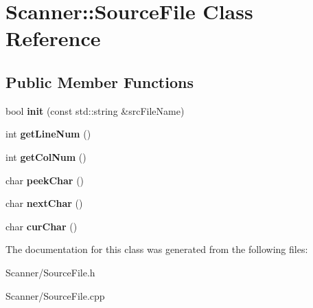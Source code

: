 \hypertarget{class_scanner_1_1_source_file}{}\section{Scanner\+:\+:Source\+File Class Reference}
\label{class_scanner_1_1_source_file}
\subsection*{Public Member Functions}
\begin{DoxyCompactItemize}
\item 
bool {\bfseries init} (const std\+::string \&src\+File\+Name)\hypertarget{class_scanner_1_1_source_file_a9eebbc5f778162566288961966df398c}{}\label{class_scanner_1_1_source_file_a9eebbc5f778162566288961966df398c}

\item 
int {\bfseries get\+Line\+Num} ()\hypertarget{class_scanner_1_1_source_file_a919d7efa693790e75e7051fc67479e34}{}\label{class_scanner_1_1_source_file_a919d7efa693790e75e7051fc67479e34}

\item 
int {\bfseries get\+Col\+Num} ()\hypertarget{class_scanner_1_1_source_file_a3e0efd4171c7225474bf1d9c5f5a8299}{}\label{class_scanner_1_1_source_file_a3e0efd4171c7225474bf1d9c5f5a8299}

\item 
char {\bfseries peek\+Char} ()\hypertarget{class_scanner_1_1_source_file_ac6f02448138ec25c4e8e338d645ea256}{}\label{class_scanner_1_1_source_file_ac6f02448138ec25c4e8e338d645ea256}

\item 
char {\bfseries next\+Char} ()\hypertarget{class_scanner_1_1_source_file_a7592182b0200b3f095ad6642ce2f6092}{}\label{class_scanner_1_1_source_file_a7592182b0200b3f095ad6642ce2f6092}

\item 
char {\bfseries cur\+Char} ()\hypertarget{class_scanner_1_1_source_file_a5ef11af7fec78f07581a071d631dd64d}{}\label{class_scanner_1_1_source_file_a5ef11af7fec78f07581a071d631dd64d}

\end{DoxyCompactItemize}


The documentation for this class was generated from the following files\+:\begin{DoxyCompactItemize}
\item 
Scanner/Source\+File.\+h\item 
Scanner/Source\+File.\+cpp\end{DoxyCompactItemize}
